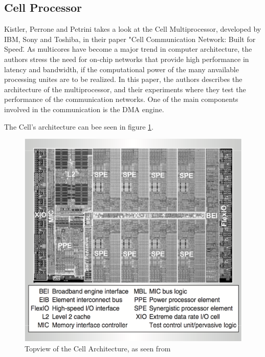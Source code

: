 \subsection{Cell Processor}
Kistler, Perrone and Petrini\cite{cell} takes a look at the Cell Multiprocessor, developed by IBM, Sony and Toshiba, in their paper "Cell Communication Network: Built for Speed\".
As multicores have become a major trend in computer architecture, the authors stress the need for on-chip networks that provide high performance in latency and bandwidth, if the computational power of the many anvailable processing unites are to be realized.
In this paper, the authors describes the architecture of the multiprocessor, and their experiments where they test the performance of the communication networks.
One of the main components involved in the communication is the DMA engine.

The Cell's architecture can bee seen in figure \ref{fig:CellTop}.
\begin{figure}[h!]
    \centering
    \includegraphics[width=1\textwidth]{Figures/DMA/CellTop}
    \caption{Topview of the Cell Architecture, as seen from \cite{cell}}
    \label{fig:CellTop}
\end{figure}

